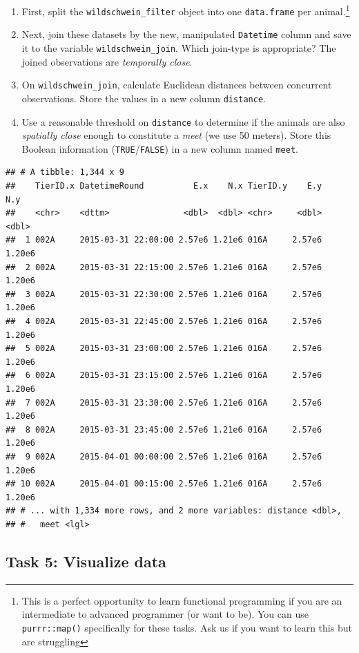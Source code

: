 \documentclass[]{book}
\providecommand{\tightlist}{%
  \setlength{\itemsep}{0pt}\setlength{\parskip}{0pt}}
\let\rmarkdownfootnote\footnote%
\def\footnote{\protect\rmarkdownfootnote}
\begin{document}
\begin{enumerate}
\def\labelenumi{\arabic{enumi}.}
\tightlist
\item
  First, split the \texttt{wildschwein\_filter} object into one
  \texttt{data.frame} per animal.\footnote{This is a perfect opportunity
    to learn functional programming if you are an intermediate to
    advanced programmer (or want to be). You can use
    \texttt{purrr::map()} specifically for these tasks. Ask us if you
    want to learn this but are struggling}
\item
  Next, join these datasets by the new, manipulated \texttt{Datetime}
  column and save it to the variable \texttt{wildschwein\_join}. Which
  join-type is appropriate? The joined observations are \emph{temporally
  close}.
\item
  On \texttt{wildschwein\_join}, calculate Euclidean distances between
  concurrent observations. Store the values in a new column
  \texttt{distance}.
\item
  Use a reasonable threshold on \texttt{distance} to determine if the
  animals are also \emph{spatially close} enough to constitute a
  \emph{meet} (we use 50 meters). Store this Boolean information
  (\texttt{TRUE}/\texttt{FALSE}) in a new column named \texttt{meet}.
\end{enumerate}

\begin{verbatim}
## # A tibble: 1,344 x 9
##    TierID.x DatetimeRound          E.x    N.x TierID.y    E.y    N.y
##    <chr>    <dttm>               <dbl>  <dbl> <chr>     <dbl>  <dbl>
##  1 002A     2015-03-31 22:00:00 2.57e6 1.21e6 016A     2.57e6 1.20e6
##  2 002A     2015-03-31 22:15:00 2.57e6 1.21e6 016A     2.57e6 1.20e6
##  3 002A     2015-03-31 22:30:00 2.57e6 1.21e6 016A     2.57e6 1.20e6
##  4 002A     2015-03-31 22:45:00 2.57e6 1.21e6 016A     2.57e6 1.20e6
##  5 002A     2015-03-31 23:00:00 2.57e6 1.21e6 016A     2.57e6 1.20e6
##  6 002A     2015-03-31 23:15:00 2.57e6 1.21e6 016A     2.57e6 1.20e6
##  7 002A     2015-03-31 23:30:00 2.57e6 1.21e6 016A     2.57e6 1.20e6
##  8 002A     2015-03-31 23:45:00 2.57e6 1.21e6 016A     2.57e6 1.20e6
##  9 002A     2015-04-01 00:00:00 2.57e6 1.21e6 016A     2.57e6 1.20e6
## 10 002A     2015-04-01 00:15:00 2.57e6 1.21e6 016A     2.57e6 1.20e6
## # ... with 1,334 more rows, and 2 more variables: distance <dbl>,
## #   meet <lgl>
\end{verbatim}

\subsection{Task 5: Visualize data}\label{task-5-visualize-data}
\end{document}
